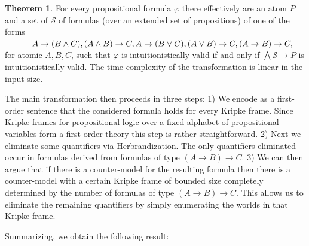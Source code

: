 \documentclass[a4paper,11pt]{report}
\theoremstyle{definition}
\newtheorem{theorem}{Theorem}[section]
\theoremstyle{definition}
\theoremstyle{definition}
\theoremstyle{definition}
\theoremstyle{definition}
\theoremstyle{definition}
\theoremstyle{definition}
\begin{document}
	\begin{theorem}\label{thm:Tseytin}
		For every propositional formula $\varphi$ there effectively are an atom $P$ and a set of $\mathcal S$ of formulas (over an extended set of propositions) of one of the forms\\
		$\text{ \hspace{1cm}} A\to (B\wedge C), (A\wedge B)\to C, A\to (B\vee C), (A\vee B)\to C, (A\to B)\to C,$\\
		for atomic $A, B, C$, such that $\varphi$ is intuitionistically valid if and only if $\bigwedge\mathcal S\to P$ is intuitionistically valid. The time complexity of the transformation is linear in the input size.
	\end{theorem}
	
	The main transformation then proceeds in three steps:
	1) We encode as a first-order sentence that the considered formula holds for every Kripke frame.
	Since Kripke frames for propositional logic over a fixed alphabet of propositional variables form a first-order theory this step is rather straightforward.
	2) Next we eliminate some quantifiers via Herbrandization. The only quantifiers eliminated occur in formulas derived from formulas of type $(A\to B)\to C$.
	3) We can then argue that if there is a counter-model for the resulting formula then there is a counter-model with a certain Kripke frame of bounded size completely determined by the number of formulas of type $(A\to B)\to C$.
	This allows us to eliminate the remaining quantifiers by simply enumerating the worlds in that Kripke frame.
	
	Summarizing, we obtain the following result:
	
\end{document}
